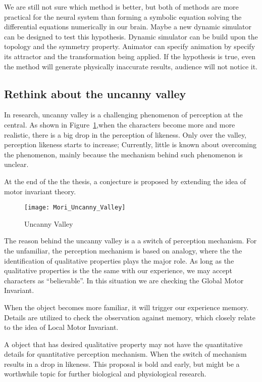 We are still not sure which method is better, but both of methods are more practical for the neural system than forming a symbolic equation solving the differential equations numerically in our brain.
Maybe a new dynamic simulator can be designed to test this hypothesis.
Dynamic simulator can be build upon the topology and the symmetry property.
Animator can specify animation by specify its attractor and the transformation being  applied.
If the hypothesis is true, even the method will generate physically inaccurate results, audience will not notice it.

\subsection{Rethink about the uncanny valley}
In \cms research, uncanny valley is a challenging phenomenon of perception at the  central. 
As shown in Figure~\ref{fig:uncannyValley},when the characters  become more and more realistic, there is a big drop in the perception of likeness.
Only over the valley, perception likeness starts to increase;
Currently, little is known about overcoming the phenomenon,
mainly because the mechanism behind such phenomenon is unclear.

At the end of the the thesis, a conjecture is proposed by extending the idea of motor invariant theory.


\begin{figure}[!htbp]
  \begin{center}
      \texttt{[image: Mori\_Uncanny\_Valley]}
    \caption{Uncanny Valley}
    \label{fig:uncannyValley}
\end{center}
\end{figure}

The reason behind the uncanny valley is a  a switch of perception mechanism.
For the unfamiliar, the perception mechanism is based on analogy,
where the the identification of qualitative properties plays the major role.
As long as the qualitative properties is the the same with our experience, we may accept characters as ``believable''.
In this situation we are checking the Global Motor Invariant.

When the object becomes more familiar, it will trigger our experience memory.
Details are utilized to check the observation against memory,
which closely relate to the idea of Local Motor Invariant.


A object that has desired qualitative property may not have the quantitative details for quantitative perception mechanism.
When the switch of mechanism results in a drop in likeness.
This proposal is bold and early, but might be a worthwhile topic for further biological and physiological research.








